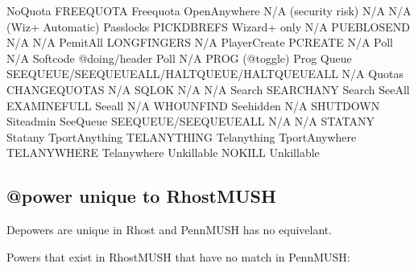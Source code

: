 \documentclass[letterpaper,10pt,english]{sphinxmanual}
\begin{document}
\begin{sphinxVerbatim}[commandchars=\\\{\}]
No\PYGZus{}Quota                FREE\PYGZus{}QUOTA                                         Free\PYGZus{}quota
Open\PYGZus{}Anywhere           N/A (security risk)                                N/A
N/A                     (Wiz+ Automatic)                                   Pass\PYGZus{}locks
PICK\PYGZus{}DBREFS             Wizard+ only                                       N/A
PUEBLO\PYGZus{}SEND             N/A                                                N/A
Pemit\PYGZus{}All               LONG\PYGZus{}FINGERS                                       N/A
Player\PYGZus{}Create           PCREATE                                            N/A
Poll                    N/A \PYGZhy{}\PYGZhy{} Softcode @doing/header                      Poll
N/A                     PROG (@toggle)                                     Prog
Queue                   SEE\PYGZus{}QUEUE/SEE\PYGZus{}QUEUE\PYGZus{}ALL/HALT\PYGZus{}QUEUE/HALT\PYGZus{}QUEUE\PYGZus{}ALL  N/A
Quotas                  CHANGE\PYGZus{}QUOTAS                                      N/A
SQL\PYGZus{}OK                  N/A                                                N/A
Search                  SEARCH\PYGZus{}ANY                                         Search
See\PYGZus{}All                 EXAMINE\PYGZus{}FULL                                       See\PYGZus{}all
N/A                     WHO\PYGZus{}UNFIND                                         See\PYGZus{}hidden
N/A                     SHUTDOWN                                           Siteadmin
See\PYGZus{}Queue               SEE\PYGZus{}QUEUE/SEE\PYGZus{}QUEUE\PYGZus{}ALL                            N/A
N/A                     STAT\PYGZus{}ANY                                           Stat\PYGZus{}any
Tport\PYGZus{}Anything          TEL\PYGZus{}ANYTHING                                       Tel\PYGZus{}anything
Tport\PYGZus{}Anywhere          TEL\PYGZus{}ANYWHERE                                       Tel\PYGZus{}anywhere
Unkillable              NOKILL                                             Unkillable
\end{sphinxVerbatim}


\subsection{@power unique to RhostMUSH}
\label{\detokenize{differences:power-unique-to-rhostmush}}
\sphinxAtStartPar
Depowers are unique in Rhost and PennMUSH has no equivelant.

\sphinxAtStartPar
Powers that exist in RhostMUSH that have no match in PennMUSH:
\end{document}
